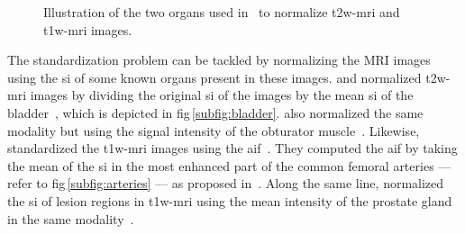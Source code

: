 \begin{figure}
\centering
	\hspace*{\fill}
	 \hfill
	\hspace*{\fill}
	\caption{Illustration of the two organs used in~\cite{Niaf2011,Niaf2012} to normalize \acs*{t2w}-\acs*{mri} and \ac{t1w}-\acs*{mri} images.}
	\label{fig:niaf}
\end{figure}

The standardization problem can be tackled by normalizing the MRI images using the \ac{si} of some known organs present in these images. 
\citeauthor{Niaf2012} and \citeauthor{lehaire2014computer} normalized \ac{t2w}-\ac{mri} images by dividing the original \ac{si} of the images by the mean \ac{si} of the bladder~\cite{Niaf2011,Niaf2012,lehaire2014computer}, which is depicted in \acs{fig}\,\ref{subfig:bladder}.
\citeauthor{giannini2015fully} also normalized the same modality but using the signal intensity of the obturator muscle~\cite{giannini2015fully}.
Likewise, \citeauthor{Niaf2011} standardized the \ac{t1w}-\ac{mri} images using the \ac{aif}~\cite{Niaf2011}.
They computed the \ac{aif} by taking the mean of the \ac{si} in the most enhanced part of the common femoral arteries --- refer to \acs{fig}\,\ref{subfig:arteries} --- as proposed in~\cite{Wiart2007}.
Along the same line, \citeauthor{samarasinghe2016semi} normalized the \ac{si} of lesion regions in \ac{t1w}-\ac{mri} using the mean intensity of the prostate gland in the same modality~\cite{samarasinghe2016semi}.

